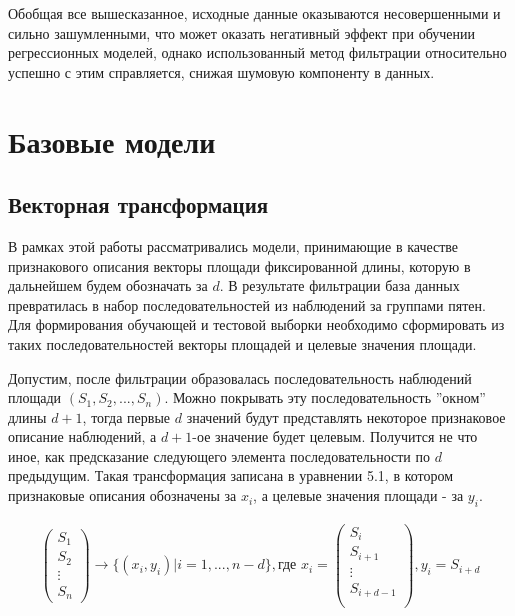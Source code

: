 \documentclass[a4paper, 12pt]{article}
\begin{document}
Обобщая все вышесказанное, исходные данные оказываются несовершенными и сильно зашумленными, что может оказать негативный эффект при обучении регрессионных моделей, однако использованный метод фильтрации относительно успешно с этим справляется, снижая шумовую компоненту в данных.

\section{Базовые модели}

\subsection{Векторная трансформация}

В рамках этой работы рассматривались модели, принимающие в качестве признакового описания векторы площади фиксированной длины, которую в дальнейшем будем обозначать за $d$. В результате фильтрации база данных превратилась в набор последовательностей из наблюдений за группами пятен. Для формирования обучающей и тестовой выборки необходимо сформировать из таких последовательностей векторы площадей и целевые значения площади.

Допустим, после фильтрации образовалась последовательность наблюдений площади $(S_1, S_2, ..., S_n)$. Можно покрывать эту последовательность ''окном'' длины $d+1$, тогда первые $d$ значений будут представлять некоторое признаковое описание наблюдений, а $d+1$-ое значение будет целевым. Получится не что иное, как предсказание следующего элемента последовательности по $d$ предыдущим. Такая трансформация записана в уравнении 5.1, в котором признаковые описания обозначены за $x_i$, а целевые значения площади - за $y_i$.

\begin{gather}
\begin{pmatrix}
    S_1 \\
    S_2 \\
    \vdots \\
    S_n
\end{pmatrix} \rightarrow
\Big\{(x_i, y_i) \Big| i = 1, ..., n - d \Big\}, \text{где }
x_i = \begin{pmatrix}
    S_i \\
    S_{i + 1} \\
    \vdots \\
    S_{i + d - 1} \\
\end{pmatrix}, y_i = S_{i + d}
\end{gather}
\end{document}
